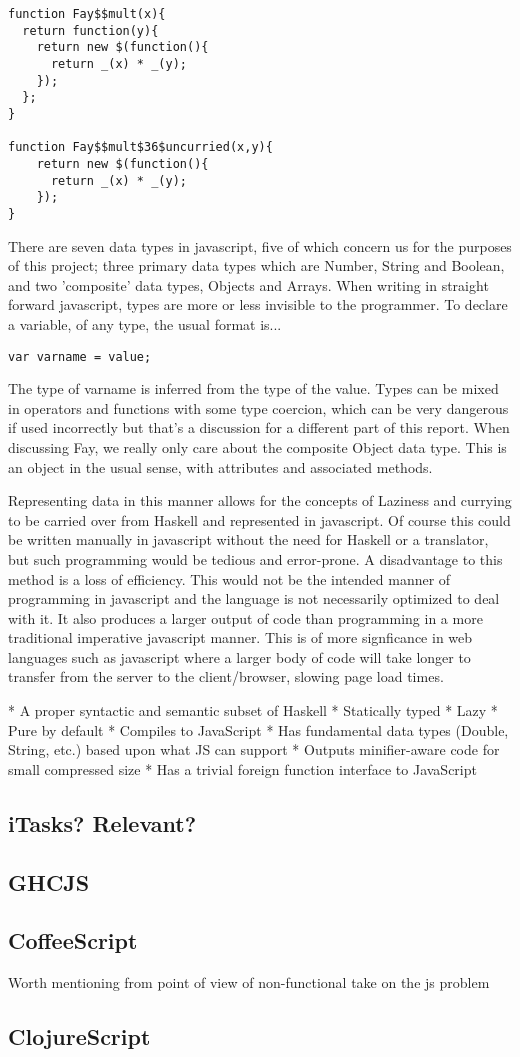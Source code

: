 \begin{verbatim}
function Fay$$mult(x){
  return function(y){
    return new $(function(){
      return _(x) * _(y);
    });
  };
}

function Fay$$mult$36$uncurried(x,y){
    return new $(function(){
      return _(x) * _(y);
    });
}
\end{verbatim}



There are seven data types in javascript, five of which concern us for the purposes
of this project; three primary data types which are Number, String and Boolean, 
and two 'composite' data types, Objects and Arrays. When writing in straight
forward javascript, types are more or less invisible to the programmer. To declare
a variable, of any type, the usual format is...
\begin{verbatim}
var varname = value;
\end{verbatim}
The type of varname is inferred from the type of the value. Types can be mixed
in operators and functions with some type coercion, which can be very dangerous
if used incorrectly but that's a discussion for a different part of this report.
When discussing Fay, we really only care about the composite Object data type. 
This is an object in the usual sense, with attributes and associated methods. 

Representing data in this manner allows for the concepts of Laziness and currying
to be carried over from Haskell and represented in javascript. Of course this could
be written manually in javascript without the need for Haskell or a translator, but
such programming would be tedious and error-prone. A disadvantage to this method is a 
loss of efficiency. This would not be the intended manner of programming in
javascript and the language is not necessarily optimized to deal with it. It
also produces a larger output of code than programming in a more traditional 
imperative javascript manner. This is of more signficance in web languages
such as javascript where a larger body of code will take longer to transfer
from the server to the client/browser, slowing page load times. 



* A proper syntactic and semantic subset of Haskell
* Statically typed
* Lazy
* Pure by default
* Compiles to JavaScript
* Has fundamental data types (Double, String, etc.) based upon what JS can support
* Outputs minifier-aware code for small compressed size
* Has a trivial foreign function interface to JavaScript

\subsection{iTasks? Relevant?}

\subsection{GHCJS}

\subsection{CoffeeScript}
Worth mentioning from point of view of non-functional take on the js problem

\subsection{ClojureScript}
